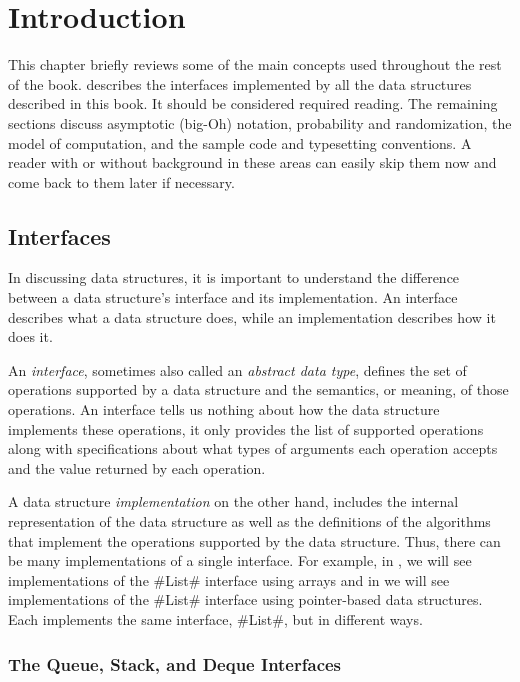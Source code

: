 \chapter{Introduction}

This chapter briefly reviews some of the main concepts used throughout
the rest of the book.    describes the interfaces
implemented by all the data structures described in this book.
It should be considered required reading.  The remaining sections discuss
asymptotic (big-Oh) notation, probability and randomization, the model of
computation, and the sample code and typesetting conventions.  A reader
with or without background in these areas can easily skip them now and
come back to them later if necessary.

\section{Interfaces}

In discussing data structures, it is important to understand the
difference between a data structure's interface and its implementation.
An interface describes what a data structure does, while an implementation
describes how it does it.

An \emph{interface}, sometimes also called an \emph{abstract data type},
defines the set of operations supported by a data structure and
the semantics, or meaning, of those operations.  An interface tells us
nothing about how the data structure implements these operations, it only
provides the list of supported operations along with specifications
about what types of arguments each operation accepts and the value
returned by each operation.

A data structure \emph{implementation} on the other hand, includes the
internal representation of the data structure as well as the definitions
of the algorithms that implement the operations supported by the data
structure.  Thus, there can be many implementations of a single interface.
For example, in , we will see implementations of the
#List# interface using arrays and in  we will
see implementations of the #List# interface using pointer-based data
structures.  Each implements the same interface, #List#,
but in different ways.

\subsection{The Queue, Stack, and Deque Interfaces}

